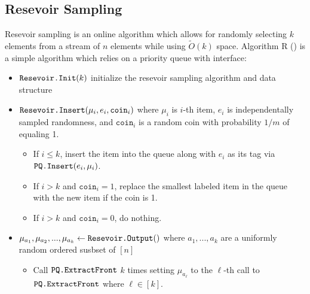\subsection{Resevoir Sampling}
Resevoir sampling is an online algorithm which allows for randomly selecting
$k$ elements from a stream of $n$ elements while using $\tilde{O}(k)$ space.
Algorithm R (\cite{vitter1985random}) is a simple algorithm which relies on a priority queue with interface:
\begin{itemize}
	\item $\texttt{Resevoir.Init}(k)$ initialize the resevoir sampling algorithm and data structure
	\item $\texttt{Resevoir.Insert}(\mu_i, e_i, \texttt{coin}_i)$ where $\mu_i$ is $i$-th item, $e_i$ is independentally sampled randomness,
	      and $\texttt{coin}_i$ is a random coin with probability $1/m$ of equaling 1.
	      \begin{itemize}
		      \item If $i \leq k$, insert the item into the queue along with $e_i$ as its tag via $\texttt{PQ.Insert}(e_i, \mu_i)$.
		      \item If $i > k$ and $\texttt{coin}_i = 1$, replace the smallest labeled item in the queue with the new item if the coin is 1.
		      \item If $i > k$ and $\texttt{coin}_i = 0$, do nothing.
	      \end{itemize}

	\item  $\mu_{a_1}, \mu_{a_2}, ..., \mu_{a_k} \gets \texttt{Resevoir.Output}()$ where $a_1, ..., a_k$ are a uniformly random ordered susbset of $[n]$
	      \begin{itemize}
		      \item Call $\texttt{PQ.ExtractFront}$ $k$ times setting $\mu_{a_\ell}$ to the $\ell$-th call to $\texttt{PQ.ExtractFront}$ where $\ell \in [k]$.
	      \end{itemize}
\end{itemize}

